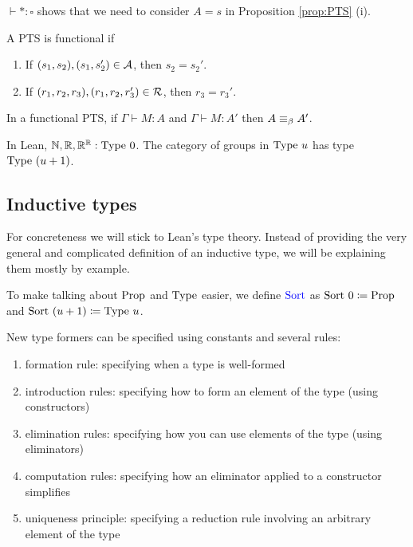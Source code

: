 \begin{rem}
    $\vdash * : \square$ shows that we need to consider $A = s$ in Proposition \ref{prop:PTS} (i).
\end{rem}

\begin{boxdefi}
    A PTS is \alert{functional} if 
    \begin{enumerate}
        \item If $(s_1, s_2), (s_1, s_2') \in \mathcal{A}$, then $s_2 =s_2'$.
        \item If $(r_1, r_2, r_3), (r_1, r_2, r_3') \in \mathcal{R}$, then $r_3 = r_3'$.
    \end{enumerate}
\end{boxdefi}

\begin{boxthm}
    In a functional PTS, if $\Gamma \vdash M : A$ and $\Gamma \vdash M : A'$ then $A \equiv_{\beta} A'$.
\end{boxthm}

\begin{rem}
    In Lean, $\mathbb{N}, \mathbb{R}, \mathbb{R}^{\mathbb{R}} : \mathrm{Type}\ 0$. 
    The category of groups in $\mathrm{Type}\ u$ has type $\mathrm{Type}\ (u + 1)$.
\end{rem}

\subsection{Inductive types}

For concreteness we will stick to Lean's type theory. 
Instead of providing the very general and complicated definition of an inductive type, we will be explaining them mostly by example. 

\begin{rem}
    To make talking about $\mathrm{Prop}$ and $\mathrm{Type}$ easier, we define $\alert{\sort}$ as $\mathrm{Sort}\ 0 \coloneq \mathrm{Prop}$ and $\mathrm{Sort}\ (u + 1) \coloneq \mathrm{Type}\ u$.
\end{rem}

\begin{boxdefi}
    New type formers can be specified using constants and several rules: 
    \begin{enumerate}
        \item \alert{formation rule}: specifying when a type is well-formed
        \item \alert{introduction rules}: specifying how to form an element of the type (using constructors)
        \item \alert{elimination rules}: specifying how you can use elements of the type (using eliminators)
        \item \alert{computation rules}: specifying how an eliminator applied to a constructor simplifies
        \item \alert{uniqueness principle}: specifying a reduction rule involving an arbitrary element of the type
    \end{enumerate}
\end{boxdefi}

